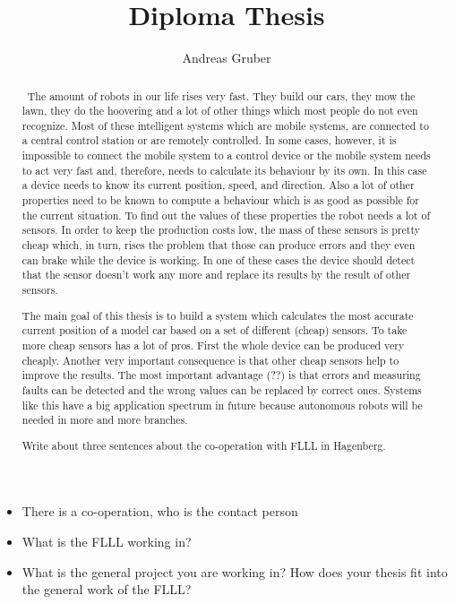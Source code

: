 \documentclass[english, 10pt]{report}
\begin{document}
\title{Diploma Thesis}


\author{Andreas Gruber}
\maketitle
\begin{abstract}
\
The amount of robots in our life rises very fast. They build our cars,
they mow the lawn, they do the hoovering and a lot of other things
which most people do not even recognize. Most of these intelligent
systems which are mobile systems, are connected to a central control
station or are remotely controlled. In some cases, however, it is
impossible to connect the mobile system to a control device or the
mobile system needs to act very fast and, therefore, needs to calculate
its behaviour by its own. In this case a device needs to know  its
current position, speed, and direction. Also a lot of other properties
need to be known to compute a behaviour which is as good as possible
for the current situation. To find out the values of these properties
the robot needs a lot of sensors. In order to keep the production
costs low, the mass of these sensors is pretty cheap which, in turn,
rises the problem that those can produce errors and they even can
brake while the device is working. In one of these cases the device
should detect that the sensor doesn't work any more and replace its
results by the result of other sensors.

The main goal of this thesis is to build a system which calculates the
most accurate current position of a model car based on a set of different
(cheap) sensors. To take more cheap sensors
has a lot of pros. First the whole device can be produced very cheaply.
Another very important consequence is that other cheap sensors help
to improve the results. The most important advantage (??) is that
errors and measuring faults can be detected and the wrong values can
be replaced by correct ones. Systems like this have a big application
spectrum in future because autonomous robots will be needed in more
and more branches.

Write about three sentences about the co-operation with FLLL in Hagenberg.\end{abstract}
\begin{itemize}
\item There is a co-operation, who is the contact person
\item What is the FLLL working in?
\item What is the general project you are working in? How does your thesis
fit into the general work of the FLLL?\end{itemize}
\end{document}
